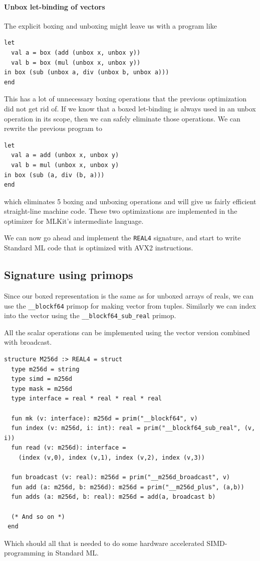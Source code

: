 \documentclass{article}
\begin{document}
\paragraph{Unbox let-binding of vectors}
The explicit boxing and unboxing might leave us with a program like
\begin{verbatim}
let
  val a = box (add (unbox x, unbox y))
  val b = box (mul (unbox x, unbox y))
in box (sub (unbox a, div (unbox b, unbox a)))
end
\end{verbatim}
This has a lot of unnecessary boxing operations that the previous optimization did not get rid of. If we know that a boxed let-binding is always used in an unbox operation in its scope, then we can safely eliminate those operations. We can rewrite the previous program to
\begin{verbatim}
let
  val a = add (unbox x, unbox y)
  val b = mul (unbox x, unbox y)
in box (sub (a, div (b, a)))
end
\end{verbatim}
which eliminates 5 boxing and unboxing operations and will give us fairly efficient straight-line machine code. These two optimizations are implemented in the optimizer for MLKit's intermediate language.

We can now go ahead and implement the \verb!REAL4! signature, and start to write Standard ML code that is optimized with AVX2 instructions.

\subsection{Signature using primops}

Since our boxed representation is the same as for unboxed arrays of reals, we can use the \verb!__blockf64! primop for making vector from tuples. Similarly we can index into the vector using the \verb!__blockf64_sub_real! primop.

All the scalar operations can be implemented using the vector version combined with broadcast.
\begin{verbatim}
structure M256d :> REAL4 = struct
  type m256d = string
  type simd = m256d
  type mask = m256d
  type interface = real * real * real * real

  fun mk (v: interface): m256d = prim("__blockf64", v)
  fun index (v: m256d, i: int): real = prim("__blockf64_sub_real", (v, i))
  fun read (v: m256d): interface =
    (index (v,0), index (v,1), index (v,2), index (v,3))

  fun broadcast (v: real): m256d = prim("__m256d_broadcast", v)
  fun add (a: m256d, b: m256d): m256d = prim("__m256d_plus", (a,b))
  fun adds (a: m256d, b: real): m256d = add(a, broadcast b)

  (* And so on *)
 end
\end{verbatim}
Which should all that is needed to do some hardware accelerated SIMD-programming in Standard ML.
\end{document}
